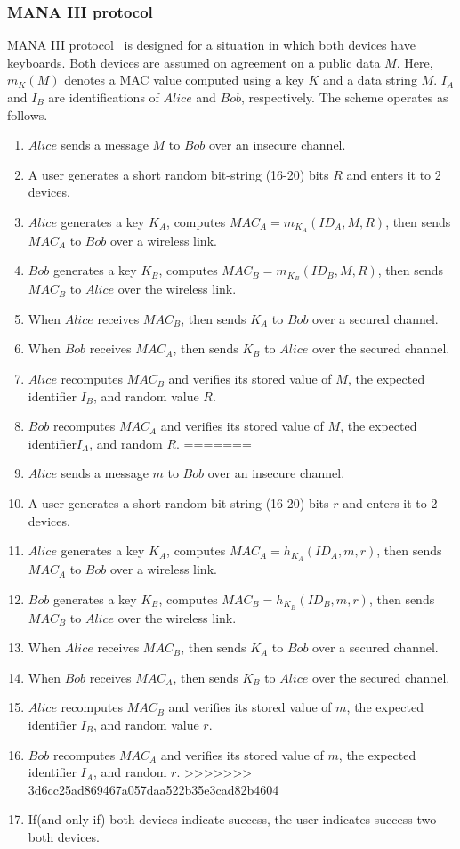\subsubsection*{MANA III protocol}

MANA III protocol~\cite{Mitchell:2004p25948} is designed for a situation in which both devices have keyboards. Both devices are assumed on agreement on a public data $M$. Here, $m_K(M)$ denotes a MAC value computed using a key $K$ and a data string $M$. $I_A$ and $I_B$ are identifications of $Alice$ and $Bob$, respectively. The scheme operates as follows. 

\begin{enumerate}
<<<<<<< HEAD
\item $Alice$ sends a message $M$ to $Bob$ over an insecure channel. 
\item A user generates a short random bit-string (16-20) bits $R$ and enters it to 2 devices.
\item $Alice$ generates a key $K_A$, computes $MAC_A = m_{K_A}(ID_A,M,R)$, then sends $MAC_A$ to $Bob$ over a wireless link.
\item $Bob$ generates a key $K_B$, computes $MAC_B = m_{K_B}(ID_B,M,R)$, then sends $MAC_B$ to $Alice$ over the wireless link.
\item When $Alice$ receives $MAC_B$, then sends $K_A$ to $Bob$ over a secured channel.
\item When $Bob$ receives $MAC_A$, then sends $K_B$ to $Alice$ over the secured channel.
\item $Alice$ recomputes $MAC_B$ and verifies its stored value of $M$, the expected identifier $I_B$, and random value $R$.
\item $Bob$ recomputes $MAC_A$ and verifies its stored value of $M$, the expected identifier$I_A$, and random $R$.
=======
\item $Alice$ sends a message $m$ to $Bob$ over an insecure channel. 
\item A user generates a short random bit-string (16-20) bits $r$ and enters it to 2 devices.
\item $Alice$ generates a key $K_A$, computes $MAC_A = h_{K_A}(ID_A,m,r)$, then sends $MAC_A$ to $Bob$ over a wireless link.
\item $Bob$ generates a key $K_B$, computes $MAC_B = h_{K_B}(ID_B,m,r)$, then sends $MAC_B$ to $Alice$ over the wireless link.
\item When $Alice$ receives $MAC_B$, then sends $K_A$ to $Bob$ over a secured channel.
\item When $Bob$ receives $MAC_A$, then sends $K_B$ to $Alice$ over the secured channel.
\item $Alice$ recomputes $MAC_B$ and verifies its stored value of $m$, the expected identifier $I_B$, and random value $r$.
\item $Bob$ recomputes $MAC_A$ and verifies its stored value of $m$, the expected identifier $I_A$, and random $r$.
>>>>>>> 3d6cc25ad869467a057daa522b35e3cad82b4604
\item If(and only if) both devices indicate success, the user indicates success two both devices.
\end{enumerate}


